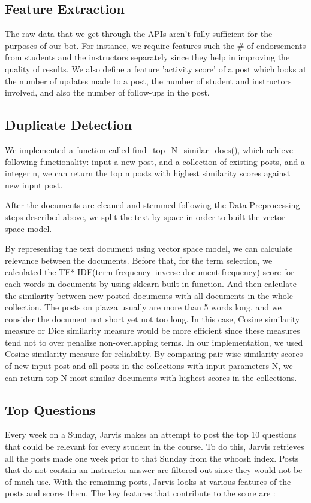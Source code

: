 \documentclass[sigconf]{acmart}
\begin{document}
\subsection{Feature Extraction}
The raw data that we get through the APIs aren't fully sufficient for the purposes of our bot. For instance, we require features such the \# of endorsements from students and the instructors separately since they help in improving the quality of results. We also define a feature 'activity score' of a post which looks at the number of updates made to a post, the number of student and instructors involved, and also the number of follow-ups in the post.



\subsection{Duplicate Detection}
We implemented a function called find\_top\_N\_similar\_docs(), which achieve following functionality: input a new post, and a collection of existing posts, and a integer n, we can return the top n posts with highest similarity scores against new input post. 

After the documents are cleaned and stemmed following the Data Preprocessing steps described above, we split the text by space in order to built the vector space model. 

By representing the text document using vector space model, we can calculate relevance between the documents. Before that, for the term selection, we calculated the TF* IDF(term frequency–inverse document frequency) score for each words in documents by using sklearn built-in function. And then calculate the similarity between new posted documents with all documents in the whole collection. The posts on piazza usually are more than 5 words long, and we consider the document not short yet not too long. In this case, Cosine similarity measure or Dice similarity measure would be more efficient since these measures tend not to over penalize non-overlapping terms. In our implementation, we used Cosine similarity measure for reliability. By comparing pair-wise similarity scores of new input post and all posts in the collections  with input parameters N, we can return top N most similar documents with highest scores in the collections. 


\subsection{Top Questions}
Every week on a Sunday, Jarvis makes an attempt to post the top 10 questions that could be relevant for every student in the course. To do this, Jarvis retrieves all the posts made one week prior to that Sunday from the whoosh index. Posts that do not contain an instructor answer are filtered out since they would not be of much use. With the remaining posts, Jarvis looks at various features of the posts and scores them. The key features that contribute to the score are :
\end{document}
